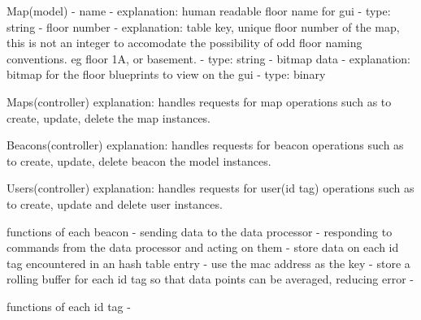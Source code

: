Map(model)
	- name
		- explanation: human readable floor name for gui
		- type: string
	- floor number
		- explanation: table key, unique floor number of the map, this is not an integer to accomodate the possibility of odd floor naming conventions. eg floor 1A, or basement.
		- type: string
	- bitmap data
		- explanation: bitmap for the floor blueprints to view on the gui
		- type: binary


Maps(controller)
	explanation: handles requests for map operations such as to create, update, delete the map instances.

Beacons(controller)
	explanation: handles requests for beacon operations such as to create, update, delete beacon the model instances.

Users(controller)
	explanation: handles requests for user(id tag) operations such as to create, update and delete user instances.

\bigskip

functions of each beacon
	- sending data to the data processor
	- responding to commands from the data processor and acting on them
	- store data on each id tag encountered in an hash table entry - use the mac address as the key
	- store a rolling buffer for each id tag so that data points can be averaged, reducing error
	-

\bigskip

functions of each id tag
	-




